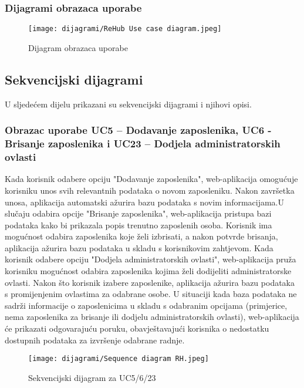 \subsubsection{Dijagrami obrazaca uporabe}

\begin{figure}[H]
	\texttt{[image: dijagrami/ReHub Use case diagram.jpeg]}
	\centering
	\caption{Dijagram obrazaca uporabe}
	\label{fig:UseCaseDiagram}
\end{figure}
\eject		

\subsection{Sekvencijski dijagrami}

U sljedećem dijelu prikazani su sekvencijski dijagrami i njihovi opisi.
\subsubsection{Obrazac uporabe UC5 – Dodavanje zaposlenika, UC6 - Brisanje zaposlenika i UC23 – Dodjela administratorskih ovlasti}


Kada korisnik odabere opciju "Dodavanje zaposlenika", web-aplikacija omogućuje korisniku unos svih relevantnih podataka o novom zaposleniku. Nakon završetka unosa, aplikacija automatski ažurira bazu podataka s novim informacijama.U slučaju odabira opcije "Brisanje zaposlenika", web-aplikacija pristupa bazi podataka kako bi prikazala popis trenutno zaposlenih osoba. Korisnik ima mogućnost odabira zaposlenika koje želi izbrisati, a nakon potvrde brisanja, aplikacija ažurira bazu podataka u skladu s korisnikovim zahtjevom. Kada korisnik odabere opciju "Dodjela administratorskih ovlasti", web-aplikacija pruža korisniku mogućnost odabira zaposlenika kojima želi dodijeliti administratorske ovlasti. Nakon što korisnik izabere zaposlenike, aplikacija ažurira bazu podataka s promijenjenim ovlastima za odabrane osobe. U situaciji kada baza podataka ne sadrži informacije o zaposlenicima u skladu s odabranim opcijama (primjerice, nema zaposlenika za brisanje ili dodjelu administratorskih ovlasti), web-aplikacija će prikazati odgovarajuću poruku, obavještavajući korisnika o nedostatku dostupnih podataka za izvršenje odabrane radnje.

\begin{figure}[H]
	\texttt{[image: dijagrami/Sequence diagram RH.jpeg]}
	\centering
	\caption{Sekvencijski dijagram za UC5/6/23}
	\label{fig:SequenceDiagram1}
\end{figure}

